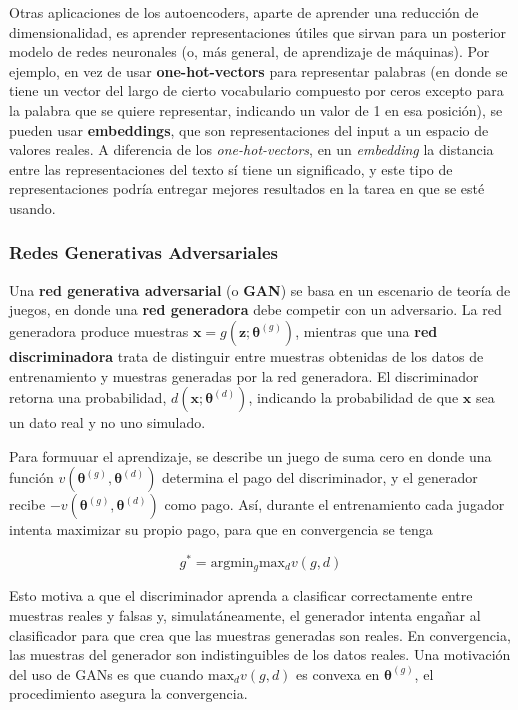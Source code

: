 Otras aplicaciones de los autoencoders, aparte de aprender una reducci\'on de dimensionalidad, es aprender representaciones \'utiles que sirvan para un posterior modelo de redes neuronales (o, m\'as general, de aprendizaje de m\'aquinas). Por ejemplo, en vez de usar \textbf{one-hot-vectors} para representar palabras (en donde se tiene un vector del largo de cierto vocabulario compuesto por ceros excepto para la palabra que se quiere representar, indicando un valor de 1 en esa posici\'on), se pueden usar \textbf{embeddings}, que son representaciones del input a un espacio de valores reales. A diferencia de los \textit{one-hot-vectors}, en un \textit{embedding} la distancia entre las representaciones del texto s\'i tiene un significado, y este tipo de representaciones podr\'ia entregar mejores resultados en la tarea en que se est\'e usando.

\subsubsection{Redes Generativas Adversariales}

Una \textbf{red generativa adversarial} (o \textbf{GAN}) se basa en un escenario de teor\'ia de juegos, en donde una \textbf{red generadora} debe competir con un adversario. La red generadora produce muestras $\bm{x} = g(\bm{z};\bm{\theta}^{(g)})$, mientras que una \textbf{red discriminadora} trata de distinguir entre muestras obtenidas de los datos de entrenamiento y muestras generadas por la red generadora. El discriminador retorna una probabilidad, $d(\bm{x};\bm{\theta}^{(d)})$, indicando la probabilidad de que $\bm{x}$ sea un dato real y no uno simulado.

Para formuuar el aprendizaje, se describe un juego de suma cero en donde una funci\'on $v(\bm{\theta}^{(g)},\bm{\theta}^{(d)})$ determina el pago del discriminador, y el generador recibe $-v(\bm{\theta}^{(g)},\bm{\theta}^{(d)})$ como pago. As\'i, durante el entrenamiento cada jugador intenta maximizar su propio pago, para que en convergencia se tenga

\begin{equation}
g^{*} = \textrm{arg} \textrm{min}_{g} \textrm{max}_{d} v(g,d)
\end{equation}

Esto motiva a que el discriminador aprenda a clasificar correctamente entre muestras reales y falsas y, simulat\'aneamente, el generador intenta enga{\~{n}}ar al clasificador para que crea que las muestras generadas son reales. En convergencia, las muestras del generador son indistinguibles de los datos reales. Una motivaci\'on del uso de GANs es que cuando $\textrm{max}_{d} v(g,d)$ es convexa en $\bm{\theta}^{(g)}$, el procedimiento asegura la convergencia.

